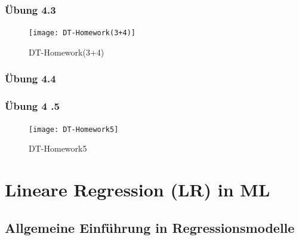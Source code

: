 \documentclass[12pt]{article}
\begin{document}
\subsubsection{Übung 4.3}

\begin{figure}[htp]
  \centering
  \hspace*{-1.5cm} 
  \texttt{[image: DT-Homework(3+4)]}
  \caption{DT-Homework(3+4)}
\label{fig:DT_Learning2}
\end{figure}

\subsubsection{Übung 4.4}


\subsubsection{Übung 4
.5}

\begin{figure}[bp]
  \centering
  \hspace*{-1.5cm} 
  \texttt{[image: DT-Homework5]}
  \caption{DT-Homework5}
\label{fig:DT_Learning2}
\end{figure}


\newpage

\section{Lineare Regression (LR) in ML \\}

\subsection{Allgemeine Einführung in Regressionsmodelle}
\end{document}

